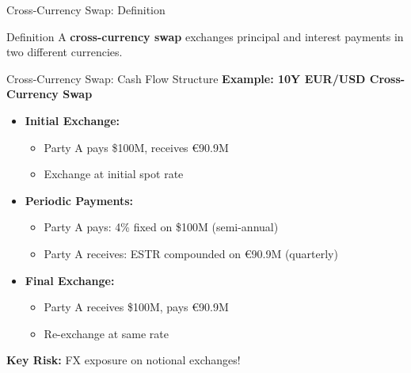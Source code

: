 \documentclass[aspectratio=169,11pt]{beamer}
\begin{document}
\begin{frame}{Cross-Currency Swap: Definition}
\begin{block}{Definition}
A \textbf{cross-currency swap} exchanges principal and interest payments in two different currencies.
\end{block}

\begin{center}
\end{center}
\end{frame}

\begin{frame}{Cross-Currency Swap: Cash Flow Structure}
\textbf{Example: 10Y EUR/USD Cross-Currency Swap}

\begin{itemize}
    \item \textbf{Initial Exchange:}
    \begin{itemize}
        \item Party A pays \$100M, receives €90.9M
        \item Exchange at initial spot rate
    \end{itemize}

    \item \textbf{Periodic Payments:}
    \begin{itemize}
        \item Party A pays: 4\% fixed on \$100M (semi-annual)
        \item Party A receives: ESTR compounded on €90.9M (quarterly)
    \end{itemize}

    \item \textbf{Final Exchange:}
    \begin{itemize}
        \item Party A receives \$100M, pays €90.9M
        \item Re-exchange at same rate
    \end{itemize}
\end{itemize}

\textbf{Key Risk:} FX exposure on notional exchanges!
\end{frame}
\end{document}
